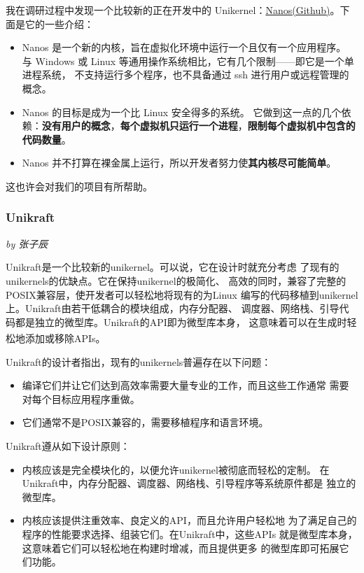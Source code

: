 \documentclass[UTF8,fontset=none,linespread=1.15]{ctexart}
\let\nosupcite\cite
\renewcommand*{\cite}[1]{\textsuperscript{\nosupcite{#1}}}
\newcommand{\sectionauthor}[1]{%
\vspace*{-5ex}
\noindent\textrm{\hfill\textit{by #1}}
\vspace*{2ex}\par}
\begin{document}
我在调研过程中发现一个比较新的正在开发中的 Unikernel：\href{https://github.com/nanovms/nanos}{Nanos(Github)}。下面是它的一些介绍：

\begin{itemize}
\item Nanos 是一个新的内核，旨在虚拟化环境中运行一个且仅有一个应用程序。
与 Windows 或 Linux 等通用操作系统相比，它有几个限制——即它是一个单进程系统，
不支持运行多个程序，也不具备通过 ssh 进行用户或远程管理的概念。
\item Nanos 的目标是成为一个比 Linux 安全得多的系统。
它做到这一点的几个依赖：\textbf{没有用户的概念}，\textbf{每个虚拟机只运行一个进程}，\textbf{限制每个虚拟机中包含的代码数量}。
\item Nanos 并不打算在裸金属上运行，所以开发者努力使\textbf{其内核尽可能简单}。
\end{itemize}

这也许会对我们的项目有所帮助。

\subsubsection{Unikraft}\sectionauthor{张子辰}
Unikraft是一个比较新的unikernel。可以说，它在设计时就充分考虑
了现有的unikernels的优缺点。它在保持unikernel的极简化、
高效的同时，兼容了完整的POSIX兼容层，使开发者可以轻松地将现有的为Linux
编写的代码移植到unikernel上。Unikraft由若干低耦合的模块组成，内存分配器、
调度器、网络栈、引导代码都是独立的微型库。Unikraft的API即为微型库本身，
这意味着可以在生成时轻松地添加或移除APIs。\cite{bib:unikraft}

Unikraft的设计者指出，现有的unikernels普遍存在以下问题：
\begin{itemize}
\item 编译它们并让它们达到高效率需要大量专业的工作，而且这些工作通常
需要对每个目标应用程序重做。
\item 它们通常不是POSIX兼容的，需要移植程序和语言环境。
\end{itemize}

Unikraft遵从如下设计原则：
\begin{itemize}
\item 内核应该是完全模块化的，以便允许unikernel被彻底而轻松的定制。
在Unikraft中，内存分配器、调度器、网络栈、引导程序等系统原件都是
独立的微型库。
\item 内核应该提供注重效率、良定义的API，而且允许用户轻松地
为了满足自己的程序的性能要求选择、组装它们。在Unikraft中，这些APIs
就是微型库本身，这意味着它们可以轻松地在构建时增减，而且提供更多
的微型库即可拓展它们功能。
\end{itemize}
\end{document}
